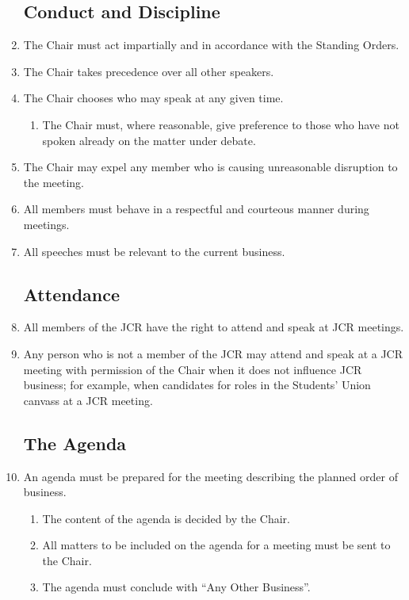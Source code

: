 \documentclass[12pt]{article}  %
\begin{document}
\begin{enumerate}
    \subsection{Conduct and Discipline}
    \item The Chair must act impartially and in accordance with the Standing Orders.
    \item The Chair takes precedence over all other speakers.
    \item The Chair chooses who may speak at any given time.
    \begin{enumerate}
        \item The Chair must, where reasonable, give preference to those who have not spoken already on the matter under debate.
    \end{enumerate}
    \item The Chair may expel any member who is causing unreasonable disruption to the meeting.
    \item All members must behave in a respectful and courteous manner during meetings.
    \item All speeches must be relevant to the current business.
    \subsection{Attendance}
    \item All members of the JCR have the right to attend and speak at JCR meetings.
    \item Any person who is not a member of the JCR may attend and speak at a JCR meeting with permission of the Chair when it does not influence JCR business; for example, when candidates for roles in the Students’ Union canvass at a JCR meeting.
    \subsection{The Agenda}
    \item An agenda must be prepared for the meeting describing the planned order of business.
    \begin{enumerate}
        \item The content of the agenda is decided by the Chair.
        \item All matters to be included on the agenda for a meeting must be sent to the Chair.
        \item The agenda must conclude with “Any Other Business”.
    \end{enumerate}

\end{enumerate}
\end{document}
